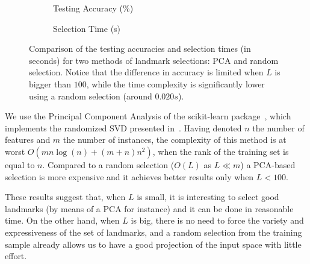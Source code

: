 \begin{figure*}[t]
\captionsetup{justification=centering}
    \begin{subfigure}{0.45\textwidth}
    \caption{
      Testing Accuracy (\%)
    }
    \end{subfigure}
    \begin{subfigure}{0.45\textwidth}
    \caption{
      Selection Time (s)
    }
    \end{subfigure}
    \caption{
      Comparison of the testing accuracies and selection times (in seconds) for two methods of landmark selections: PCA and random selection. Notice that the difference in accuracy is limited when $L$ is bigger than $100$, while the time complexity is significantly lower using a random selection (around $0.020s$).
    }
    \label{fig:pca}

\end{figure*}

We use the Principal Component Analysis of the scikit-learn package~\cite{scikit-learn}, which implements the randomized SVD presented in~\cite{halko2011finding}. Having denoted $n$ the number of features and $m$ the number of instances, the complexity of this method is at worst $O(mn\log(n) + (m+n)n^2)$, when the rank of the training set is equal to $n$. Compared to a random selection ($O(L)$ as $L \ll m$) a PCA-based selection is more expensive and it achieves better results only when $L < 100$. 

These results suggest that, when $L$ is small, it is interesting to select good landmarks (by means of a PCA for instance) and it can be done in reasonable time. On the other hand, when $L$ is big, there is no need to force the variety and expressiveness of the set of landmarks, and a random selection from the training sample already allows us to have a good projection of the input space with little effort.


